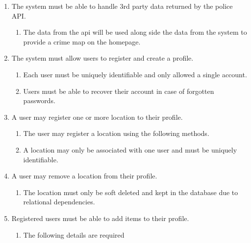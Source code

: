\begin{enumerate}[label=\textbf{F\arabic*}]
\item The system must be able to handle 3rd party data returned by the police API.
	\begin{enumerate}
		\item The data from the api will be used along side the data from the system to provide a crime map on the homepage.
	\end{enumerate}
\item The system must allow users to register and create a profile.
	\begin{enumerate}[leftmargin=0.75in]
		\item Each user must be uniquely identifiable and only allowed a single account.
		\item Users must be able to recover their account in case of forgotten passwords.
	\end{enumerate}
\item A user may register one or more location to their profile.
	\begin{enumerate}[leftmargin=0.75in]
		\item The user may register a location using the following methods.
		\item A location may only be associated with one user and must be uniquely identifiable.
	\end{enumerate}
\item A user may remove a location from their profile.
	\begin{enumerate}[leftmargin=0.75in]
		\item The location must only be soft deleted and kept in the database due to relational dependencies.
	\end{enumerate}
\item Registered users must be able to add items to their profile.
	\begin{enumerate}[leftmargin=0.75in]
		\item The following details are required
\end{enumerate}
\end{enumerate}
